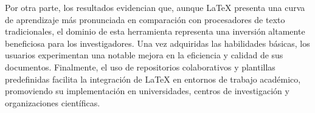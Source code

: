 \documentclass[10pt,twocolumn]{article}
\begin{document}
    Por otra parte, los resultados evidencian que, aunque LaTeX presenta una curva de aprendizaje más pronunciada en comparación con procesadores de texto tradicionales, el dominio de esta herramienta representa una inversión altamente beneficiosa para los investigadores. 
    Una vez adquiridas las habilidades básicas, los usuarios experimentan una notable mejora en la eficiencia y calidad de sus documentos. Finalmente, el uso de repositorios colaborativos y plantillas predefinidas facilita la integración de LaTeX en entornos de trabajo académico, promoviendo su implementación en universidades, centros de investigación y organizaciones científicas.

%
\printbibliography
%
\end{document}
